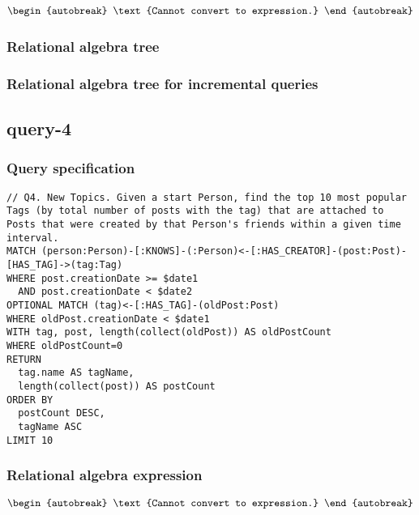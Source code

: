 \begin{align*}
\begin{autobreak}
\text{Cannot convert to expression.}
\end{autobreak}
\end{align*}

\subsubsection*{Relational algebra tree}


\subsubsection*{Relational algebra tree for incremental queries}

\subsection{query-4}

\subsubsection*{Query specification}

\begin{lstlisting}
// Q4. New Topics. Given a start Person, find the top 10 most popular Tags (by total number of posts with the tag) that are attached to Posts that were created by that Person's friends within a given time interval.
MATCH (person:Person)-[:KNOWS]-(:Person)<-[:HAS_CREATOR]-(post:Post)-[HAS_TAG]->(tag:Tag)
WHERE post.creationDate >= $date1
  AND post.creationDate < $date2
OPTIONAL MATCH (tag)<-[:HAS_TAG]-(oldPost:Post)
WHERE oldPost.creationDate < $date1
WITH tag, post, length(collect(oldPost)) AS oldPostCount
WHERE oldPostCount=0
RETURN
  tag.name AS tagName,
  length(collect(post)) AS postCount
ORDER BY
  postCount DESC,
  tagName ASC
LIMIT 10
\end{lstlisting}

\subsubsection*{Relational algebra expression}

\begin{align*}
\begin{autobreak}
\text{Cannot convert to expression.}
\end{autobreak}
\end{align*}

